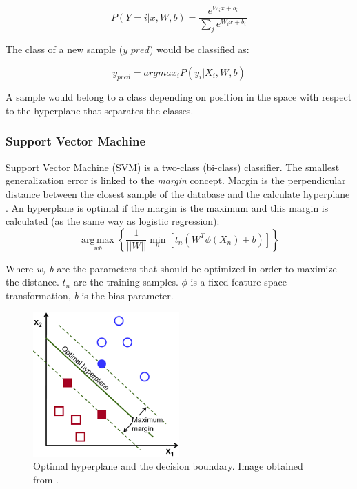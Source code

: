 \begin{equation}
P(Y=i|x,W,b) = \frac{e^{W_ix+b_i}}{\sum_j e^{W_ix+b_i}}
\end{equation}

The class of a new sample ($y\_{pred}$) would be classified as:

\begin{equation}
y_{pred} = argmax_{i}P(y_i|X_i,W,b)
\end{equation}

A sample would belong to a class depending on position in the space with respect to the hyperplane that separates the classes.\\

\subsubsection{Support Vector Machine}
Support Vector Machine (SVM) is a two-class (bi-class) classifier. The smallest generalization error is linked to the \textit{margin} concept. Margin is the perpendicular distance between the closest sample of the database and the calculate hyperplane \cite{MachineLearning}. An hyperplane is optimal if the margin is the maximum and this margin is calculated (as the same way as logistic regression):\\

\begin{equation}
\underset{w b}{\operatorname{arg\,max}}\left \{ \frac{1}{||W||} \underset{n}{\operatorname{min}}[t_{n}(W^T \phi (X_n)+b)]   \right \}
\end{equation}


Where \textit{w, b} are the parameters that should be optimized in order to maximize the distance. \textit{$t_n$} are the training samples. $\phi$ is a fixed feature-space transformation, \textit{b} is the bias parameter.\\

\begin{figure}[htb]
\centering
\includegraphics[width=0.5\textwidth]{images_miscelaneus/svm.png}
\caption{Optimal hyperplane and the decision boundary. Image obtained from \cite{SVMimage}.} \label{fig:SVM}
\end{figure}

